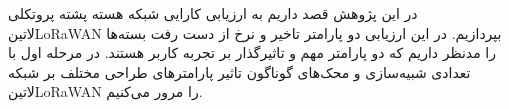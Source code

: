 
در این پژوهش قصد داریم به ارزیابی کارایی شبکه هسته پشته پروتکلی ‌لاتین{LoRaWAN}
بپردازیم. در این ارزیابی دو پارامتر تاخیر و نرخ از دست رفت بسته‌ها را مدنظر داریم که دو پارامتر مهم
و تاثیرگذار بر تجربه کاربر هستند.
در مرحله اول با تعدادی شبیه‌سازی و محک‌های گوناگون تاثیر پارامترهای طراحی مختلف بر شبکه ‌لاتین{LoRaWAN}
را مرور می‌کنیم.

